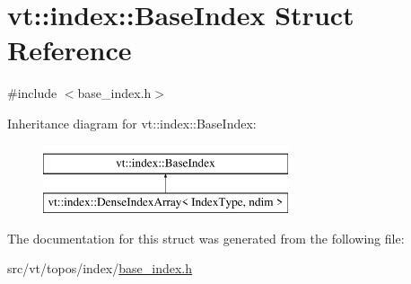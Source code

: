 \hypertarget{structvt_1_1index_1_1_base_index}{}\section{vt\+:\+:index\+:\+:Base\+Index Struct Reference}
\label{structvt_1_1index_1_1_base_index}


{\ttfamily \#include $<$base\+\_\+index.\+h$>$}

Inheritance diagram for vt\+:\+:index\+:\+:Base\+Index\+:\begin{figure}[H]
\begin{center}
\leavevmode
\includegraphics[height=2.000000cm]{structvt_1_1index_1_1_base_index}
\end{center}
\end{figure}


The documentation for this struct was generated from the following file\+:\begin{DoxyCompactItemize}
\item 
src/vt/topos/index/\hyperlink{base__index_8h}{base\+\_\+index.\+h}\end{DoxyCompactItemize}
